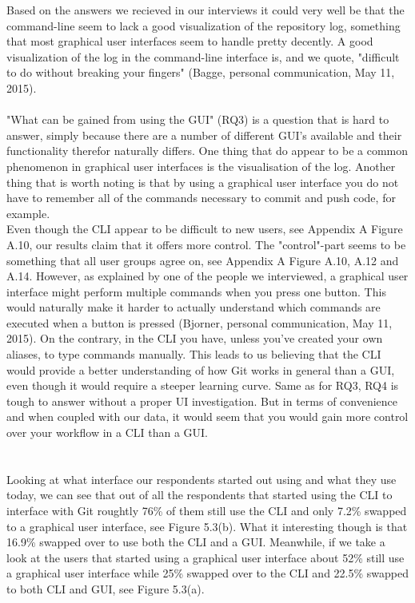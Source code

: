\documentclass[a4paper,oneside]{bth} %
\begin{document}
				Based on the answers we recieved in our interviews it could very well be that the command-line seem to lack a good visualization of the repository log, something that most graphical user interfaces seem to handle pretty decently.
				A good visualization of the log in the command-line interface is, and we quote, "difficult to do without breaking your fingers" (Bagge, personal communication, May 11, 2015). %
				\\\\
				"What can be gained from using the GUI" (RQ3) is a question that is hard to answer, simply because there are a number of different GUI's available and their functionality therefor naturally differs.
				One thing that do appear to be a common phenomenon in graphical user interfaces is the visualisation of the log.
				Another thing that is worth noting is that by using a graphical user interface you do not have to remember all of the commands necessary to commit and push code, for example.\\
				
				Even though the CLI appear to be difficult to new users, see Appendix A Figure A.10, our results claim that it offers more control. The "control"-part seems to be something that all user groups agree on, see Appendix A Figure A.10, A.12 and A.14.
				However, as explained by one of the people we interviewed, a graphical user interface might perform multiple commands when you press one button. This would naturally make it harder to actually understand which commands are executed when a button is pressed (Bjorner, personal communication, May 11, 2015). %
				On the contrary, in the CLI you have, unless you've created your own aliases, to type commands manually.
				This leads to us believing that the CLI would provide a better understanding of how Git works in general than a GUI, even though it would require a steeper learning curve.
				Same as for RQ3, RQ4 is tough to answer without a proper UI investigation. But in terms of convenience and when coupled with our data, it would seem that you would gain more control over your workflow in a CLI than a GUI.\\
				\\\\
				Looking at what interface our respondents started out using and what they use today, we can see that out of all the respondents that started using the CLI to interface with Git roughtly 76\% of them still use the CLI and only 7.2\% swapped to a graphical user interface, see Figure 5.3(b).
				What it interesting though is that 16.9\% swapped over to use both the CLI and a GUI.
				Meanwhile, if we take a look at the users that started using a graphical user interface about 52\% still use a graphical user interface while 25\% swapped over to the CLI and 22.5\% swapped to both CLI and GUI, see Figure 5.3(a).
				
\end{document}
